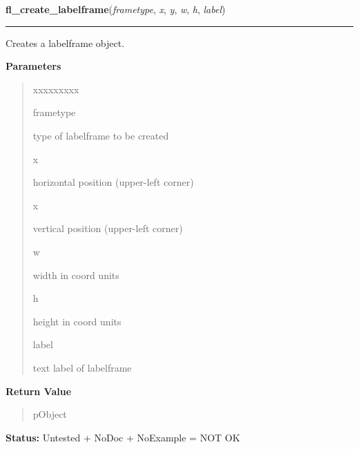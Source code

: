     \label{xformslib:library:fl_create_labelframe}

    \vspace{0.5ex}

\hspace{.8\funcindent}\begin{boxedminipage}{\funcwidth}

    \raggedright \textbf{fl\_create\_labelframe}(\textit{frametype}, \textit{x}, \textit{y}, \textit{w}, \textit{h}, \textit{label})

    \vspace{-1.5ex}

    \rule{\textwidth}{0.5\fboxrule}
\setlength{\parskip}{2ex}
    Creates a labelframe object.

\setlength{\parskip}{1ex}
      \textbf{Parameters}
      \vspace{-1ex}

      \begin{quote}
        \begin{Ventry}{xxxxxxxxx}

          \item[frametype]

          type of labelframe to be created

          \item[x]

          horizontal position (upper-left corner)

          \item[x]

          vertical position (upper-left corner)

          \item[w]

          width in coord units

          \item[h]

          height in coord units

          \item[label]

          text label of labelframe

        \end{Ventry}

      \end{quote}

      \textbf{Return Value}
    \vspace{-1ex}

      \begin{quote}
      pObject

      \end{quote}

\textbf{Status:} Untested + NoDoc + NoExample = NOT OK



    \end{boxedminipage}

